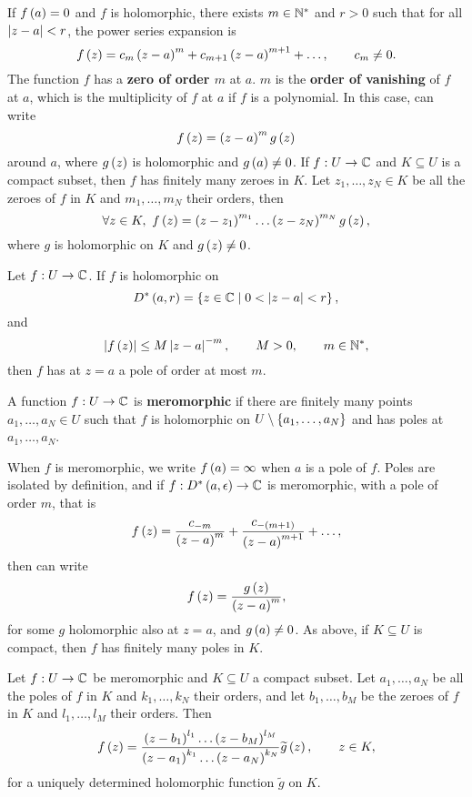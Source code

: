 \begin{remark}
If $ f\left( a \right) = 0 $ and $ f $ is holomorphic, there exists $ m \in \mathbb{N}^* $ and $ r > 0 $ such that for all $ \left\lvert z - a \right\rvert < r $, the power series expansion is
$$ f\left( z \right) = c_m\left( z - a \right)^m + c_{m + 1}\left( z - a \right)^{m + 1} + \dots, \qquad c_m \ne 0. $$
The function $ f $ has a \textbf{zero of order $ m $} at $ a $. $ m $ is the \textbf{order of vanishing} of $ f $ at $ a $, which is the multiplicity of $ f $ at $ a $ if $ f $ is a polynomial. In this case, can write
$$ f\left( z \right) = \left( z - a \right)^mg\left( z \right) $$
around $ a $, where $ g\left( z \right) $ is holomorphic and $ g\left( a \right) \ne 0 $. If $ f : U \to \mathbb{C} $ and $ K \subseteq U $ is a compact subset, then $ f $ has finitely many zeroes in $ K $. Let $ z_1, \dots, z_N \in K $ be all the zeroes of $ f $ in $ K $ and $ m_1, \dots, m_N $ their orders, then
$$ \forall z \in K, \ f\rb{z} = \rb{z - z_1}^{m_1} \dots \rb{z - z_N}^{m_N}g\rb{z}, $$
where $ g $ is holomorphic on $ K $ and $ g\left( z \right) \ne 0 $.
\end{remark}

\begin{proposition}
Let $ f : U \to \mathbb{C} $. If $ f $ is holomorphic on
$$ D^*\left( a, r \right) = \left\{ z \in \mathbb{C} \mid 0 < \left\lvert z - a \right\rvert < r \right\}, $$
and
$$ \left\lvert f\left( z \right) \right\rvert \le M\left\lvert z - a \right\rvert^{-m}, \qquad M > 0, \qquad m \in \mathbb{N}^*, $$
then $ f $ has at $ z = a $ a pole of order at most $ m $.
\end{proposition}

\begin{definition}
A function $ f : U \to \mathbb{C} $ is \textbf{meromorphic} if there are finitely many points $ a_1, \dots, a_N \in U $ such that $ f $ is holomorphic on $ U \setminus \left\{ a_1, \dots, a_N \right\} $ and has poles at $ a_1, \dots, a_N $.
\end{definition}

\begin{remark}
When $ f $ is meromorphic, we write $ f\left( a \right) = \infty $ when $ a $ is a pole of $ f $. Poles are isolated by definition, and if $ f : D^*\left( a, \epsilon \right) \to \mathbb{C} $ is meromorphic, with a pole of order $ m $, that is
$$ f\left( z \right) = \dfrac{c_{-m}}{\left( z - a \right)^m} + \dfrac{c_{-\left( m + 1 \right)}}{\left( z - a \right)^{m + 1}} + \dots, $$
then can write
$$ f\left( z \right) = \dfrac{g\left( z \right)}{\left( z - a \right)^m}, $$
for some $ g $ holomorphic also at $ z = a $, and $ g\left( a \right) \ne 0 $. As above, if $ K \subseteq U $ is compact, then $ f $ has finitely many poles in $ K $.
\end{remark}

\begin{proposition}
Let $ f : U \to \mathbb{C} $ be meromorphic and $ K \subseteq U $ a compact subset. Let $ a_1, \dots, a_N $ be all the poles of $ f $ in $ K $ and $ k_1, \dots, k_N $ their orders, and let $ b_1, \dots, b_M $ be the zeroes of $ f $ in $ K $ and $ l_1, \dots, l_M $ their orders. Then
$$ f\left( z \right) = \dfrac{\left( z - b_1 \right)^{l_1} \dots \left( z - b_M \right)^{l_M}}{\left( z - a_1 \right)^{k_1} \dots \left( z - a_N \right)^{k_N}}\widetilde{g}\left( z \right), \qquad z \in K, $$
for a uniquely determined holomorphic function $ \widetilde{g} $ on $ K $.
\end{proposition}

